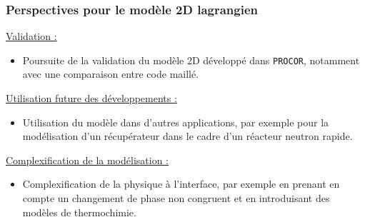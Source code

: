 \documentclass{beamer}
\newcommand{\procor}{\texttt{PROCOR}}
\begin{document}
\begin{frame}
    \frametitle{Perspectives pour le modèle 2D lagrangien}
    \scriptsize
    \color{cea_rouge}\underline{Validation :} \color{cea_texte}
         \begin{itemize}
        	\item  Poursuite de la validation du modèle 2D développé dans \procor, notamment avec une comparaison entre code maillé.
        	\end{itemize}
        	\color{cea_rouge}\underline{Utilisation future des développements :} \color{cea_texte}
        	\begin{itemize}
        	 \item  Utilisation du modèle dans d'autres applications, par exemple pour la modélisation d'un récupérateur dans le cadre d'un réacteur neutron rapide.
        	 
        	  
            
        \end{itemize}
        	
        	\color{cea_rouge}\underline{Complexification de la modélisation :} \color{cea_texte}
        \begin{itemize}
        	\item  Complexification de la physique à l'interface, par exemple en prenant en compte un changement de phase non congruent et en introduisant des modèles de thermochimie.
        	\end{itemize}
        	

\end{frame}
\end{document}
